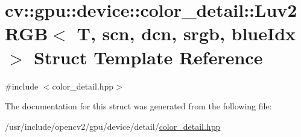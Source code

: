 \hypertarget{structcv_1_1gpu_1_1device_1_1color__detail_1_1Luv2RGB}{\section{cv\-:\-:gpu\-:\-:device\-:\-:color\-\_\-detail\-:\-:Luv2\-R\-G\-B$<$ T, scn, dcn, srgb, blue\-Idx $>$ Struct Template Reference}
\label{structcv_1_1gpu_1_1device_1_1color__detail_1_1Luv2RGB}
}


{\ttfamily \#include $<$color\-\_\-detail.\-hpp$>$}



The documentation for this struct was generated from the following file\-:\begin{DoxyCompactItemize}
\item 
/usr/include/opencv2/gpu/device/detail/\hyperlink{color__detail_8hpp}{color\-\_\-detail.\-hpp}\end{DoxyCompactItemize}
